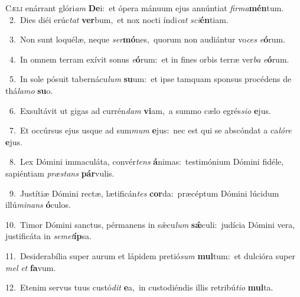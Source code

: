 \lettrine{\initial\textcolor{\initialcolor}{C}}{æli} enárrant glóri\textit{am} \textbf{De}\-i:~\star et ópera mánuum ejus annúntiat \textit{fir}\-\textit{ma}\textbf{mén}tum.\\
{\numbfont\textcolor{\numbcolor}{~2.}}~Dies diéi erúc\textit{tat} \textbf{ver}\-bum,~\star et nox nocti índi\textit{cat} \textit{sci}\-\textbf{én}tiam.\par
{\numbfont\textcolor{\numbcolor}{~3.}}~Non sunt loquélæ, neque \textit{ser}\-\textbf{mó}nes,~\star quorum non audiántur vo\textit{ces} \textit{e}\-\textbf{ó}rum.\par
{\numbfont\textcolor{\numbcolor}{~4.}}~In omnem terram exívit sonus \textit{e}\-\textbf{ó}rum:~\star et in fines orbis terræ ver\textit{ba} \textit{e}\-\textbf{ó}rum.\par
{\numbfont\textcolor{\numbcolor}{~5.}}~In sole pósuit tabernácu\textit{lum} \textbf{su}\-um:~\star et ipse tamquam sponsus procédens de thá\-\textit{la}\-\textit{mo} \textbf{su}\-o.\par
{\numbfont\textcolor{\numbcolor}{~6.}}~Exsultávit ut gigas ad currén\textit{dam} \textbf{vi}\-am,~\star a summo cælo egrés\-\textit{si}\-\textit{o} \textbf{e}\-jus.\par
{\numbfont\textcolor{\numbcolor}{~7.}}~Et occúrsus ejus usque ad sum\textit{mum} \textbf{e}\-jus:~\star nec est qui se abscóndat a ca\-\textit{ló}\-\textit{re} \textbf{e}\-jus.\par
{\numbfont\textcolor{\numbcolor}{~8.}}~Lex Dómini immaculáta, convér\textit{tens} \textbf{á}\-nimas:~\star testimónium Dómini fidéle, sapiéntiam \textit{præ}\-\textit{stans} \textbf{pár}\-vulis.\par
{\numbfont\textcolor{\numbcolor}{~9.}}~Justítiæ Dómini rectæ, lætificán\textit{tes} \textbf{cor}\-da:~\star præcéptum Dómini lúcidum illú\-\textit{mi}\-\textit{nans} \textbf{ó}\-culos.\par
{\numbfont\textcolor{\numbcolor}{10.}}~Timor Dómini sanctus, pérmanens in sǽcu\textit{lum} \textbf{sǽ}\-culi:~\star judícia Dómini vera, justificáta in \textit{se}\-\textit{met}\textbf{íp}sa.\par
{\numbfont\textcolor{\numbcolor}{11.}}~Desiderabília super aurum et lápidem pretió\textit{sum} \textbf{mul}\-tum:~\star et dulcióra super \textit{mel} \textit{et} \textbf{fa}\-vum.\par
{\numbfont\textcolor{\numbcolor}{12.}}~Etenim servus tuus custó\textit{dit} \textbf{e}\-a,~\star in custodiéndis illis retribú\-\textit{ti}\-\textit{o} \textbf{mul}\-ta.\par

